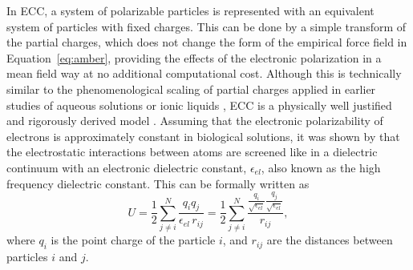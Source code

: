 \documentclass[journal=jpcbfk,manuscript=article]{achemso}
\begin{document}
In ECC, a system of polarizable particles is represented 
with an equivalent system of particles with fixed charges. %
This can be done by a simple transform of the partial charges,
which does not change the form of the empirical force field in Equation~\ref{eq:amber}, 
providing the effects of the electronic polarization in a mean field way at no additional computational cost. 
Although this is technically similar to the phenomenological scaling of partial charges 
applied in earlier studies of aqueous solutions or ionic liquids \citep{jonsson86,egberts94,beichel14},
ECC is a physically well justified and rigorously derived model \citep{leontyev09, leontyev10, leontyev11, leontyev14}.
Assuming that the electronic polarizability of electrons is approximately constant in biological solutions, 
it was shown by \citet{leontyev11} that the electrostatic interactions between atoms 
are screened like in a dielectric continuum 
with an electronic dielectric constant, $\epsilon _{el}$, 
also known as the high frequency dielectric constant. 
This can be formally written as
\begin{equation}  \label{eq:coulomb}
   U = \frac{1}{2} \displaystyle \sum ^N _{j\neq i} \frac{q_i q_j}{\epsilon_{el} \, r_{ij}}  =  \frac{1}{2} \displaystyle \sum ^N _{j\neq i} \frac{\frac{q_i}{\sqrt{\epsilon _{el}}} \frac{q_j}{\sqrt{\epsilon _{el}}}}{r_{ij}}  , 
\end{equation} 
where $q_i$ is the point charge of the particle $i$,
and $r_{ij}$ are the distances between particles $i$ and $j$.
\end{document}
